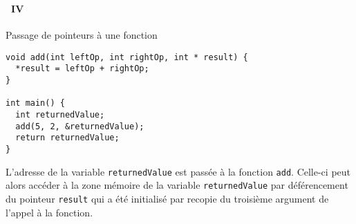 \begin{frame}[containsverbatim]
  \frametitle{\secname}
  \framesubtitle{\subsecname~IV}

  \begin{exampleblock}{Passage de pointeurs à une fonction}
    \begin{verbatim}
void add(int leftOp, int rightOp, int * result) {
  *result = leftOp + rightOp;
}

int main() {
  int returnedValue;
  add(5, 2, &returnedValue);
  return returnedValue;
}\end{verbatim}
  \end{exampleblock}
  \vspace{0.3cm}
  \par
  L'adresse de la variable \texttt{returnedValue} est passée à la fonction \texttt{add}. Celle-ci peut alors accéder à la zone mémoire de 
  la variable \texttt{returnedValue} par déférencement du pointeur \texttt{result} qui a été initialisé par recopie du troisième argument
  de l'appel à la fonction.
\end{frame}


